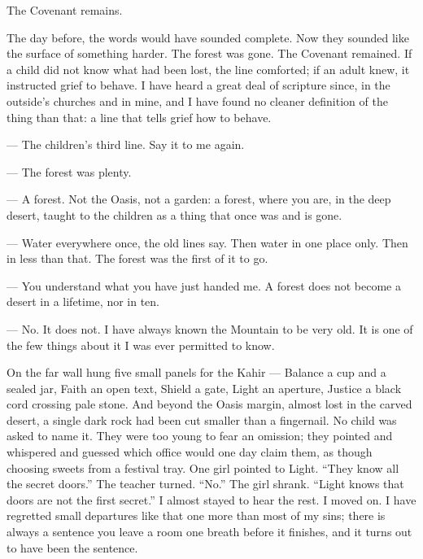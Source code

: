 \begin{scripture}
The Covenant remains.
\end{scripture}

The day before, the words would have sounded complete. Now they sounded like the surface of something harder. The forest was gone. The Covenant remained. If a child did not know what had been lost, the line comforted; if an adult knew, it instructed grief to behave. I have heard a great deal of scripture since, in the outside's churches and in mine, and I have found no cleaner definition of the thing than that: a line that tells grief how to behave.\par

\begin{room}

--- The children's third line. Say it to me again.

--- The forest was plenty.

--- A forest. Not the Oasis, not a garden: a forest, where you are, in the deep desert, taught to the children as a thing that once was and is gone.

--- Water everywhere once, the old lines say. Then water in one place only. Then in less than that. The forest was the first of it to go.

--- You understand what you have just handed me. A forest does not become a desert in a lifetime, nor in ten.

--- No. It does not. I have always known the Mountain to be very old. It is one of the few things about it I was ever permitted to know.

\end{room}

On the far wall hung five small panels for the Kahir --- Balance a cup and a sealed jar, Faith an open text, Shield a gate, Light an aperture, Justice a black cord crossing pale stone. And beyond the Oasis margin, almost lost in the carved desert, a single dark rock had been cut smaller than a fingernail. No child was asked to name it. They were too young to fear an omission; they pointed and whispered and guessed which office would one day claim them, as though choosing sweets from a festival tray. One girl pointed to Light. ``They know all the secret doors.'' The teacher turned. ``No.'' The girl shrank. ``Light knows that doors are not the first secret.'' I almost stayed to hear the rest. I moved on. I have regretted small departures like that one more than most of my sins; there is always a sentence you leave a room one breath before it finishes, and it turns out to have been the sentence.\par

